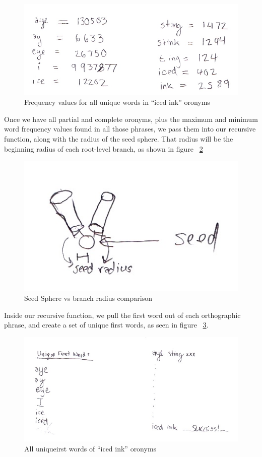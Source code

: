 \begin{figure}[ht]
\begin{center}
\includegraphics[width=.5\textwidth]{Fig3_3_2_FreqValsForIcedInkOronyms.jpg}
\captionfonts
\caption[FreqValsForIcedInkOronyms]{Frequency values for all unique words in ``iced ink'' oronyms}
\label{fig:oronymTree:FreqValsForIcedInkOronyms}
\end{center}
\end{figure}

Once we have all partial and complete oronyms, plus the maximum and minimum word frequency values found in all those phrases, we pass them into our recursive function, along with the radius of the seed sphere.  That radius will be the beginning radius of each root-level branch, as shown in figure ~\ref{fig:oronymTree:seedSphere}

\begin{figure}[ht]
\begin{center}
\includegraphics[width=.33\textwidth]{Fig3_3_3_SeedSphere.jpg}
\captionfonts
\caption[Seed Sphere vs branch radius comparison]{Seed Sphere vs branch radius comparison}
\label{fig:oronymTree:seedSphere}
\end{center}
\end{figure}

Inside our recursive function, we pull the first word out of each orthographic phrase, and create a set of unique first words, as seen in figure ~\ref{fig:oronymTree:grabFirstWordsIcedInkOronyms}.  

\begin{figure}[ht]
\begin{center}
\includegraphics[width=.5\textwidth]{Fig3_3_4_GrabFirstWordsIcedInkOronyms.jpg}
\captionfonts
\caption[Unique first words of Iced Ink oronyms]{All uniqueirst words of ``iced ink'' oronyms}
\label{fig:oronymTree:grabFirstWordsIcedInkOronyms}
\end{center}
\end{figure}

